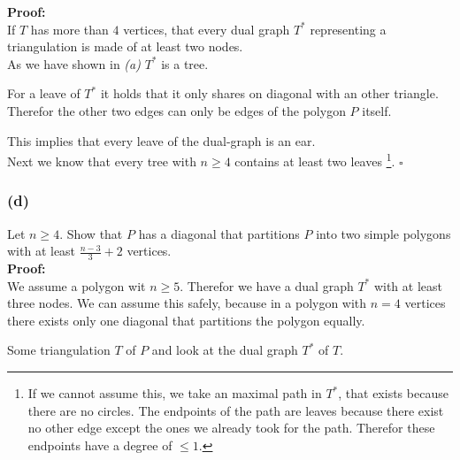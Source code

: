 \documentclass[11pt,a4paper,ngerman]{article}
\begin{document}
\textbf{Proof:}\\

If $T$ has more than $4$ vertices, that every dual graph $T^*$ representing 
a triangulation is made of at least two nodes.\\
As we have shown in \emph{(a)} $T^*$ is a tree.

For a leave of $T^*$ it holds that it only shares on diagonal with an other triangle.
Therefor the other two edges can only be edges of the polygon $P$ itself.

This implies that every leave of the dual-graph is an ear.\\

Next we know that every tree with $n\geq 4$ contains at least two leaves
\footnote{If we cannot assume this, we take an maximal path in $T^*$, that exists because there are no circles.
The endpoints of the path are leaves because there exist no other edge except the ones we already took for the path.
Therefor these endpoints have a degree of $\leq 1$.}.
\mbox{} \hfill $\square$

\subsubsection*{(d)}

Let $n \geq 4$. Show that $P$ has a diagonal that partitions $P$ into two
simple polygons with at least $\frac{n-3}{3} + 2$ vertices.\\

\textbf{Proof:}\\

We assume a polygon wit $n\geq 5$. Therefor we have a dual graph $T^*$ with at least
three nodes. We can assume this safely, because in a polygon with $n = 4$ vertices
there exists only one diagonal that partitions the polygon equally.

Some triangulation $T$ of $P$ and look at the dual graph $T^*$ of $T$.
\end{document}
